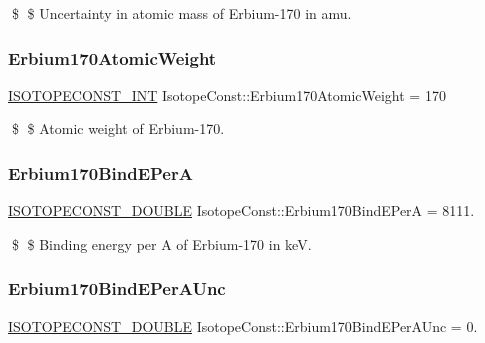 \$ \$ Uncertainty in atomic mass of Erbium-\/170 in amu. \mbox{\label{group___isotope_const-_erbium-_er170_ga4c86c5c084030fb0f44508ccb1d903e2}} 
\subsubsection{\texorpdfstring{Erbium170\+Atomic\+Weight}{Erbium170AtomicWeight}}
{\footnotesize\ttfamily \mbox{\hyperlink{group___isotope_const-_macros_ga5f18360b3e99483a35c32d789e62621c}{I\+S\+O\+T\+O\+P\+E\+C\+O\+N\+S\+T\+\_\+\+I\+NT}} Isotope\+Const\+::\+Erbium170\+Atomic\+Weight = 170}

\$ \$ Atomic weight of Erbium-\/170. \mbox{\label{group___isotope_const-_erbium-_er170_gaa0bd42e7585baafdb14a16d3166e619a}} 
\subsubsection{\texorpdfstring{Erbium170\+Bind\+E\+PerA}{Erbium170BindEPerA}}
{\footnotesize\ttfamily \mbox{\hyperlink{group___isotope_const-_macros_ga8f45a7272ce02c0b4c65c44636ed719a}{I\+S\+O\+T\+O\+P\+E\+C\+O\+N\+S\+T\+\_\+\+D\+O\+U\+B\+LE}} Isotope\+Const\+::\+Erbium170\+Bind\+E\+PerA = 8111.}

\$ \$ Binding energy per A of Erbium-\/170 in keV. \mbox{\label{group___isotope_const-_erbium-_er170_ga99d30ab586c6f74b0a74fec64c7a07b5}} 
\subsubsection{\texorpdfstring{Erbium170\+Bind\+E\+Per\+A\+Unc}{Erbium170BindEPerAUnc}}
{\footnotesize\ttfamily \mbox{\hyperlink{group___isotope_const-_macros_ga8f45a7272ce02c0b4c65c44636ed719a}{I\+S\+O\+T\+O\+P\+E\+C\+O\+N\+S\+T\+\_\+\+D\+O\+U\+B\+LE}} Isotope\+Const\+::\+Erbium170\+Bind\+E\+Per\+A\+Unc = 0.}

